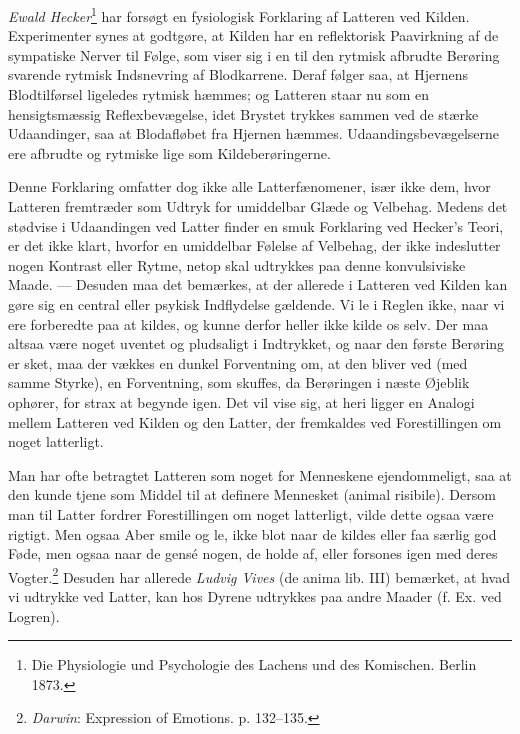 \documentclass[12pt,a4paper,openany]{book}
\newcommand{\opage}[1]{\marginnote{\footnotesize\textit{[#1]}}}
\begin{document}
\emph{Ewald Hecker}\footnote[3]{Die Physiologie und Psychologie des
Lachens und des Komischen. Berlin 1873.} har forsøgt en fysiologisk
Forklaring af Latteren ved Kilden. Experimenter synes at godtgøre, at
Kilden har en reflektorisk Paavirkning af de sympatiske Nerver til
Følge, som viser sig i en til den rytmisk afbrudte Berøring
\opage{345}svarende rytmisk Indsnevring af Blodkarrene. Deraf følger
saa, at Hjernens Blodtilførsel ligeledes rytmisk hæmmes; og Latteren
staar nu som en hensigtsmæssig Reflexbevægelse, idet Brystet trykkes
sammen ved de stærke Udaandinger, saa at Blodafløbet fra Hjernen hæmmes.
Udaandingsbevægelserne ere afbrudte og rytmiske lige som
Kildeberøringerne.





Denne Forklaring omfatter dog ikke alle Latterfænomener, især ikke dem,
hvor Latteren fremtræder som Udtryk for umiddelbar Glæde og Velbehag.
Medens det stødvise i Udaandingen ved Latter finder en smuk Forklaring
ved Hecker’s Teori, er det ikke klart, hvorfor en umiddelbar Følelse af
Velbehag, der ikke indeslutter nogen Kontrast eller Rytme, netop skal
udtrykkes paa denne konvulsiviske Maade. --- Desuden maa det bemærkes,
at der allerede i Latteren ved Kilden kan gøre sig en central eller
psykisk Indflydelse gældende. Vi le i Reglen ikke, naar vi ere
forberedte paa at kildes, og kunne derfor heller ikke kilde os selv. Der
maa altsaa være noget uventet og pludsaligt i Indtrykket, og naar den
første Berøring er sket, maa der vækkes en dunkel Forventning om, at den
bliver ved (med samme Styrke), en Forventning, som skuffes, da
Berøringen i næste Øjeblik ophører, for strax at begynde igen. Det vil
vise sig, at heri ligger en Analogi mellem Latteren ved Kilden og den
Latter, der fremkaldes ved Forestillingen om noget latterligt.

Man har ofte betragtet Latteren som noget for Menneskene ejendommeligt,
saa at den kunde tjene som Middel til at definere Mennesket (animal
risibile). Dersom man til Latter fordrer Forestillingen om noget
latterligt, vilde dette ogsaa være rigtigt. Men ogsaa Aber smile og le,
ikke blot naar de kildes eller faa særlig god Føde, men ogsaa naar de
gensé nogen, de holde af, eller forsones igen med deres
Vogter.\footnote[1]{\emph{Darwin}: Expression of Emotions. p. 132--135.}
Desuden har allerede \emph{Ludvig Vives} (de anima lib. III) bemærket,
at hvad vi udtrykke ved Latter, kan hos Dyrene udtrykkes paa andre
Maader (f. Ex. ved Logren).
\end{document}
